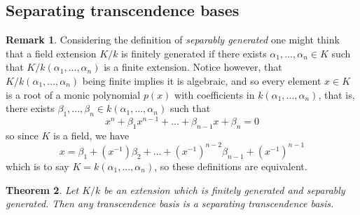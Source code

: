 \documentclass[12pt]{article}
\theoremstyle{plain}
\newtheorem{thm}{Theorem}[subsection] %
\theoremstyle{definition}
\newtheorem{remark}[thm]{Remark}
\begin{document}
\subsection{Separating transcendence bases}
\begin{remark}
Considering the definition of \emph{separably generated} one might think that a field extension $K/k$ is finitely generated if there exists $\alpha_1,...,\alpha_n \in K$ such that $K/k(\alpha_1,...,\alpha_n)$ is a finite extension. Notice however, that $K/k(\alpha_1,...,\alpha_n)$ being finite implies it is algebraic, and so every element $x \in K$ is a root of a monic polynomial $p(x)$ with coefficients in $k(\alpha_1,...,\alpha_n)$, that is, there exists $\beta_1,...,\beta_n \in k(\alpha_1,...,\alpha_n)$ such that
\[x^n + \beta_1 x^{n-1} + \hdots + \beta_{n-1}x + \beta_n = 0\]
so since $K$ is a field, we have
\[x = \beta_1 + (x^{-1})\beta_2 + \hdots + (x^{-1})^{n-2}\beta_{n-1} + (x^{-1})^{n-1}\]
which is to say $K = k(\alpha_1,...,\alpha_n)$, so these definitions are equivalent.
\end{remark}
\begin{thm}
\label{thm:sep_transc_subset}
Let $K/k$ be an extension which is finitely generated and separably generated. Then any transcendence basis is a separating transcendence basis.
\end{thm}
\end{document}
